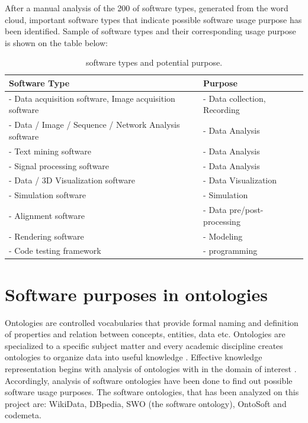 After a manual analysis of the 200 of software types, generated from the word cloud, important software types that indicate possible software usage purpose has been identified. Sample of software types and their corresponding usage purpose is shown on the table below:

\begin{table}[h!]
	\begin{center}
		\caption{software types and potential purpose.}
		\label{tab:table1}
		\begin{tabular}{|l|l|} %
			\hline
			\textbf{Software Type} & \textbf{Purpose} \\
			\hline
			- Data acquisition software, Image acquisition software  & - Data collection, Recording  \\
			\hline
			- Data / Image  / Sequence  / Network  Analysis software  & - Data Analysis  \\
			\hline
			- Text mining software  & - Data Analysis  \\
			\hline
			- Signal processing software  & - Data Analysis  \\
			\hline
			- Data / 3D Visualization software & - Data Visualization  \\
			\hline
			- Simulation software  & - Simulation  \\
			\hline
			- Alignment software  & - Data pre/post-processing \\
			\hline
			- Rendering software  & - Modeling  \\
			\hline
			-	Code testing framework   & - programming  \\
			\hline
		\end{tabular}
	\end{center}
\end{table}
\section{Software purposes in ontologies   }

Ontologies are controlled vocabularies that provide formal naming and definition of properties and relation between concepts, entities, data etc.  Ontologies  are specialized  to a specific subject matter and every academic discipline creates ontologies to organize data into useful knowledge \citep{enwiki:1060388948}. 
Effective knowledge representation begins with analysis of ontologies with in the domain of interest \citep{chandrasekaran1999ontologies}. Accordingly, analysis of software ontologies have been done to find out possible software usage purposes. The software ontologies, that has been analyzed on this project are: WikiData, DBpedia, SWO (the software ontology), OntoSoft and codemeta.  
